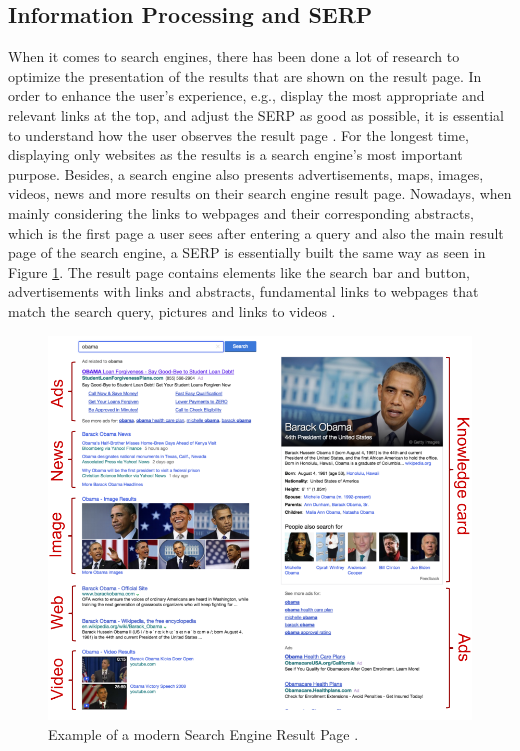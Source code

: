 \subsection{Information Processing and SERP}
\label{subsection:ReadingSERP}
When it comes to search engines, there has been done a lot of research to optimize the presentation of the results that are shown on the result page.  In order to enhance the user's experience, e.g., display the most appropriate and relevant links at the top, and adjust the SERP as good as possible, it is essential to understand how the user observes the result page \autocite{buscher2010good, liu2015influence}.
For the longest time, displaying only websites as the results is a search engine's most important purpose. Besides, a search engine also presents advertisements, maps, images, videos, news and more results on their search engine result page. Nowadays, when mainly considering the links to webpages and their corresponding abstracts, which is the first page a user sees after entering a query and also the main result page of the search engine, a SERP is essentially built the same way as seen in Figure \ref{figure:ModernSerp}.
The result page contains elements like the search bar and button, advertisements with links and abstracts, fundamental links to webpages that match the search query, pictures and links to videos \autocite{wang2016beyond}.

\begin{figure}[!ht]
    \centering
    \includegraphics[width=1\linewidth]{images/SERP_wang2016beyond.png}
    \caption{
        Example of a modern Search Engine Result Page \autocite[104]{wang2016beyond}.
    }
    \label{figure:ModernSerp}
\end{figure}

